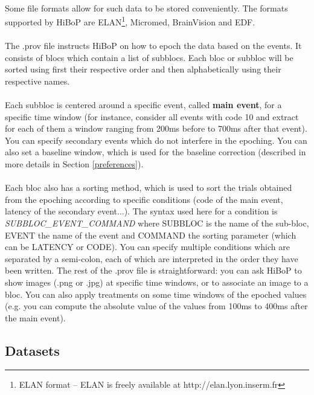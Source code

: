 \documentclass[a4paper]{article}
\begin{document}
\paragraph{} Some file formats allow for such data to be stored conveniently. The formats supported by HiBoP are ELAN\footnote{\label{ELAN}ELAN format – ELAN is freely available at http://elan.lyon.inserm.fr}, Micromed, BrainVision and EDF.
\paragraph{} The .prov file instructs HiBoP on how to epoch the data based on the events. It consists of blocs which contain a list of subblocs. Each bloc or subbloc will be sorted using first their respective order and then alphabetically using their respective names.
\paragraph{} Each subbloc is centered around a specific event, called \textbf{main event}, for a specific time window (for instance, consider all events with code 10 and extract for each of them a window ranging from 200ms before to 700ms after that event). You can specify secondary events which do not interfere in the epoching. You can also set a baseline window, which is used for the baseline correction (described in more details in Section \ref{preferences}). 
\paragraph{} Each bloc also has a sorting method, which is used to sort the trials obtained from the epoching according to specific conditions (code of the main event, latency of the secondary event...). The syntax used here for a condition is \textit{SUBBLOC\_EVENT\_COMMAND} where SUBBLOC is the name of the sub-bloc, EVENT the name of the event and COMMAND the sorting parameter (which can be LATENCY or CODE). You can specify multiple conditions which are separated by a semi-colon, each of which are interpreted in the order they have been written. The rest of the .prov file is straightforward: you can ask HiBoP to show images (.png or .jpg) at specific time windows, or to associate an image to a bloc. You can also apply treatments on some time windows of the epoched values (e.g. you can compute the absolute value of the values from 100ms to 400ms after the main event).
\subsection{Datasets}
\end{document}
